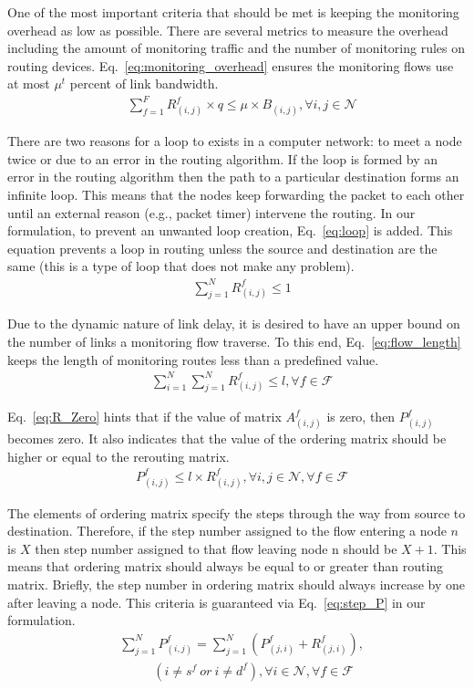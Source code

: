 \documentclass[10pt, journal, letterpaper]{IEEEtran}
\begin{document}
One of the most important criteria that should be met is keeping the monitoring overhead as low as possible. There are several metrics to measure the overhead including the amount of monitoring traffic and the number of monitoring rules on routing devices. Eq.~\ref{eq:monitoring_overhead} ensures the monitoring flows use at most $\mu^t$ percent of link bandwidth.
\begin{align}\label{eq:monitoring_overhead}
    & \sum_{f=1}^F{R_{(i,j)}^{f}}\times q\leq \mu\times B_{(i,j)},   \forall i,j \in \mathcal{N}
\end{align}

There are two reasons for a loop to exists in a computer network: to meet a node twice or due to an error in the routing algorithm. If the loop is formed by an error in the routing algorithm then the path to a particular destination forms an infinite loop. This means that the nodes keep forwarding the packet to each other until an external reason (e.g., packet timer) intervene the routing. In our formulation, to prevent an unwanted loop creation, Eq.~\ref{eq:loop} is added. This equation prevents a loop in routing unless the source and destination are the same (this is a type of loop that does not make any problem).
\begin{align}\label{eq:loop}
    & \sum_{j=1}^N{R_{(i,j)}^{f}}\leq 1
\end{align}

Due to the dynamic nature of link delay, it is desired to have an upper bound on the number of links a monitoring flow traverse. To this end, Eq.~\ref{eq:flow_length} keeps the length of monitoring routes less than a predefined value.
\begin{align} \label{eq:flow_length}
    & \sum_{i=1}^N{\sum_{j=1}^N{R_{(i,j)}^{f}}}\leq l,     \forall f\in \mathcal{F}
\end{align}

Eq.~\eqref{eq:R_Zero} hints that if the value of matrix $A_{(i,j)}^f$ is zero, then $P^f_{(i,j)}$ becomes zero. It also indicates that the value of the ordering matrix should be higher or equal to the rerouting matrix.
\begin{align} \label{eq:R_Zero}
    & P_{(i,j)}^{f}\leq l\times R^f_{(i,j)},     \forall i,j \in \mathcal{N}, \forall f\in \mathcal{F}
\end{align}

The elements of ordering matrix specify the steps through the way from source to destination. Therefore, if the step number assigned to the flow entering a node $n$ is $X$ then step number assigned to that flow leaving node n should be $X+1$. This means that ordering matrix should always be equal to or greater than routing matrix. Briefly, the step number in ordering matrix should always increase by one after leaving a node. This criteria is guaranteed via Eq.~\ref{eq:step_P} in our formulation.
\begin{align} \label{eq:step_P}
    & \sum_{j=1}^N{P_{(i,j)}^{f}} = \sum_{j=1}^N{\left(P_{(j,i)}^f+R_{(j,i)}^f\right)}, \\\nonumber
    &~~~~~~~~~~~~(i\neq s^f ~or~ i\neq d^f), \forall i\in \mathcal{N}, \forall f\in \mathcal{F}
\end{align}
\end{document}
